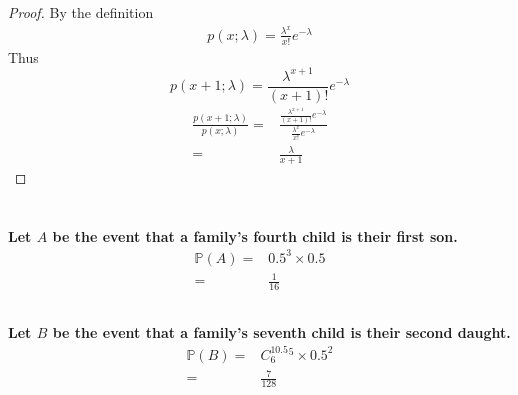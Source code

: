 \documentclass{article}
\begin{document}
    \section{}
        \begin{proof}
            By the definition
            \begin{equation*}
                \begin{split}
                    p(x;\lambda)=\frac{\lambda^x}{x!}e^{-\lambda}
                \end{split}
            \end{equation*}
            Thus
            $$p(x+1;\lambda)=\frac{\lambda^{x+1}}{(x+1)!}e^{-\lambda}$$
            \begin{equation*}
                \begin{split}
                    \frac{p(x+1;\lambda)}{p(x;\lambda)}=&\frac{\frac{\lambda^{x+1}}{(x+1)!}e^{-\lambda}}{\frac{\lambda^x}{x!}e^{-\lambda}}\\
                        =&\frac{\lambda}{x+1}
                \end{split}
            \end{equation*}
        \end{proof}
    
    \section{}
        \subsection{}
            \paragraph{
                Let $A$ be the event that a family’s fourth child is their first son.
                \begin{equation*}
                    \begin{split}
                        \mathbb{P}(A)=&0.5^3\times 0.5\\
                            =&\frac{1}{16}
                    \end{split}
                \end{equation*}
            }
        \subsection{}
            \paragraph{
                Let $B$ be the event that a family’s seventh child is their second daught.
                \begin{equation*}
                    \begin{split}
                        \mathbb{P}(B)=&C_6^10.5^5\times 0.5^2\\
                            =&\frac{7}{128}
                    \end{split}
                \end{equation*}
            }
\end{document}
